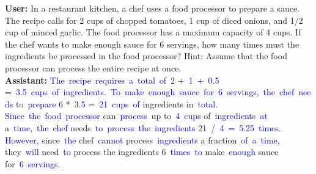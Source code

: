\begin{tcolorbox}[colframe=gray!70!black,colback=white, title=Sample 2]
\textbf{User:}
In a restaurant kitchen, a chef uses a food processor to prepare a sauce. The recipe calls for 2 cups of chopped tomatoes, 1 cup of diced onions, and 1/2 cup of minced garlic. The food processor has a maximum capacity of 4 cups. If the chef wants to make enough sauce for 6 servings, how many times must the ingredients be processed in the food processor? 
Hint: Assume that the food processor can process the entire recipe at once. \vspace{0.1in}
\\
\textbf{Assistant:}
\textcolor{blue}{The}\textcolor{blue}{~recipe}\textcolor{blue}{~requires}\textcolor{blue}{~a}\textcolor{blue}{~total}\textcolor{blue}{~of}\textcolor{blue}{~}2 +\textcolor{blue}{~}\textcolor{blue}{1}\textcolor{blue}{~+}\textcolor{blue}{~}\textcolor{blue}{0}\textcolor{blue}{.}\textcolor{blue}{5} =\textcolor{blue}{~}\textcolor{blue}{3}\textcolor{blue}{.}\textcolor{blue}{5}\textcolor{blue}{~cups}\textcolor{blue}{~of}\textcolor{blue}{~ingredients}\textcolor{blue}{.}\textcolor{blue}{~To}\textcolor{blue}{~make}\textcolor{blue}{~enough}\textcolor{blue}{~sauce}\textcolor{blue}{~for}\textcolor{blue}{~}\textcolor{blue}{6}\textcolor{blue}{~servings},\textcolor{blue}{~the}\textcolor{blue}{~chef}\textcolor{blue}{~needs} to\textcolor{blue}{~prepare} 6 *\textcolor{blue}{~}3.\textcolor{blue}{5} =\textcolor{blue}{~}\textcolor{blue}{21}\textcolor{blue}{~cups}\textcolor{blue}{~of} ingredients in\textcolor{blue}{~total}\textcolor{blue}{.}\textcolor{blue}{~
}\textcolor{blue}{Since}\textcolor{blue}{~the}\textcolor{blue}{~food}\textcolor{blue}{~processor} can\textcolor{blue}{~process}\textcolor{blue}{~up} to\textcolor{blue}{~}\textcolor{blue}{4}\textcolor{blue}{~cups} of\textcolor{blue}{~ingredients}\textcolor{blue}{~at} a\textcolor{blue}{~time},\textcolor{blue}{~the}\textcolor{blue}{~chef} needs\textcolor{blue}{~to}\textcolor{blue}{~process}\textcolor{blue}{~the}\textcolor{blue}{~ingredients} 21\textcolor{blue}{~/}\textcolor{blue}{~}\textcolor{blue}{4}\textcolor{blue}{~=}\textcolor{blue}{~}\textcolor{blue}{5}\textcolor{blue}{.}\textcolor{blue}{25}\textcolor{blue}{~times}\textcolor{blue}{.} 
\textcolor{blue}{However}\textcolor{blue}{,} since\textcolor{blue}{~the} chef\textcolor{blue}{~cannot} process\textcolor{blue}{~ingredients} a fraction\textcolor{blue}{~of}\textcolor{blue}{~a}\textcolor{blue}{~time}, they\textcolor{blue}{~will} need\textcolor{blue}{~to} process the ingredients 6\textcolor{blue}{~times}\textcolor{blue}{~to} make\textcolor{blue}{~enough} sauce for\textcolor{blue}{~}\textcolor{blue}{6}\textcolor{blue}{~servings}\textcolor{blue}{.}\textcolor{blue}{}
\end{tcolorbox}




